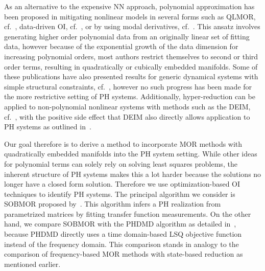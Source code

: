 As an alternative to the expensive \ac{NN} approach, polynomial approximation has been proposed in mitigating nonlinear models in several forms such as QLMOR, cf.~\cite{Gu2011}, data-driven \ac{OI}, cf.~\cite{Peherstorfer2016, Kramer2019, BGK2020, Qian2022, Geelen2023, Sharma2023}, or by using modal derivatives, cf.~\cite{Jain2017, Rutzmoser2017}.
This ansatz involves generating higher order polynomial data from an originally linear set of fitting data, however because of the exponential growth of the data dimension for increasing polynomial orders, most authors restrict themselves to second or third order terms, resulting in quadratically or cubically embedded manifolds.
Some of these publications have also presented results for generic dynamical systems with simple structural constraints, cf.~\cite{BGH2020, Qian2020, Gosea2021, Khodabakhshi2022}, however no such progress has been made for the more restrictive setting of \ac{PH} systems.
Additionally, hyper-reduction can be applied to non-polynomial nonlinear systems with methods such as the \ac{DEIM}, cf.~\cite{Chaturantabut2010}, with the positive side effect that \ac{DEIM} also directly allows application to \ac{PH} systems as outlined in~\cite{Chaturantabut2016}.

Our goal therefore is to derive a method to incorporate \ac{MOR} methods with quadratically embedded manifolds into the \ac{PH} system setting.
While other ideas for polynomial terms can solely rely on solving least squares problems, the inherent structure of \ac{PH} systems makes this a lot harder because the solutions no longer have a closed form solution.
Therefore we use optimization-based \ac{OI} techniques to identify \ac{PH} systems.
The principal algorithm we consider is \ac{SOBMOR} proposed by~\cite{Schwerdtner2023}.
This algorithm infers a \ac{PH} realization from parametrized matrices by fitting transfer function measurements.
On the other hand, we compare \ac{SOBMOR} with the \ac{PHDMD} algorithm as detailed in~\cite{Morandin2022}, because \ac{PHDMD} directly uses a time domain-based \ac{LSQ} objective function instead of the frequency domain.
This comparison stands in analogy to the comparison of frequency-based \ac{MOR} methods with state-based reduction as mentioned earlier.

